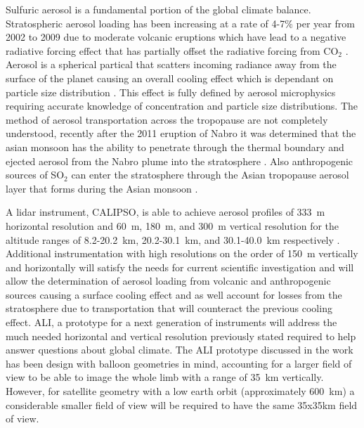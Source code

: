 \documentclass[12pt]{article}
\begin{document}
Sulfuric aerosol is a fundamental portion of the global climate balance. Stratospheric aerosol loading has been increasing at a rate of 4-7\% per year from 2002 to 2009 due to moderate volcanic eruptions \citep{Vernier2011} which have lead to a negative radiative forcing effect that has partially offset the radiative forcing from CO$_{2}$ \citep{Solomon2011}. Aerosol is a spherical partical that scatters incoming radiance away from the surface of the planet causing an overall cooling effect which is dependant on particle size distribution \citep{Kiehl1993}. This effect is fully defined by aerosol microphysics requiring accurate knowledge of concentration and particle size distributions. The method of aerosol transportation across the tropopause are not completely understood, recently after the 2011 eruption of Nabro it was determined that the asian monsoon has the ability to penetrate through the thermal boundary and ejected aerosol from the Nabro plume into the stratosphere \citep{Bourassa2012c}. Also anthropogenic sources of SO$_{2}$ can enter the stratosphere  through the Asian tropopause aerosol layer that forms during the Asian monsoon \citep{Vernier2011, Neely2014}.

A lidar instrument, CALIPSO, is able to achieve aerosol profiles of 333~m horizontal resolution and 60~m, 180~m, and 300~m vertical resolution for the altitude ranges of 8.2-20.2~km, 20.2-30.1~km, and 30.1-40.0~km respectively \citep{Winker2003}. Additional instrumentation with high resolutions on the order of 150~m vertically and horizontally will satisfy the needs for current scientific investigation and will allow the determination of aerosol loading from volcanic and anthropogenic sources causing a surface cooling effect and as well account for losses from the stratosphere due to transportation that will counteract the previous cooling effect. ALI, a prototype for a next generation of instruments will address the much needed horizontal and vertical resolution previously stated required to help answer questions about global climate. The ALI prototype discussed in the work has been design with balloon geometries in mind, accounting for a larger field of view to be able to image the whole limb with a range of 35~km vertically. However, for satellite geometry with a low earth orbit (approximately 600~km) a considerable smaller field of view will be required to have the same 35x35km field of view.

\end{document}
